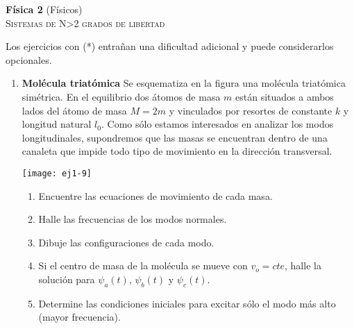 \documentclass[11pt,spanish,a4paper]{article}
\begin{document}
\begin{center}
\textbf{Física 2} (Físicos) \hfill {}\\
	\textsc{\LARGE Sistemas de N\textgreater2 grados de libertad}
\end{center}

Los ejercicios con (*) entrañan una dificultad adicional y puede considerarlos opcionales.


\begin{enumerate}


\item
\begin{minipage}[t][2.6cm]{0.75\textwidth}
\textbf{Molécula triatómica}
Se esquematiza en la figura una molécula triatómica simétrica.
En el equilibrio dos átomos de masa $m$ están situados a ambos lados del átomo de masa $M=2m$ y vinculados por resortes de constante $k$ y longitud natural $l_0$.
Como sólo estamos interesados en analizar los modos longitudinales, supondremos que las masas se encuentran dentro de una canaleta que impide todo tipo de movimiento en la dirección transversal.
\end{minipage}
\begin{minipage}[c][0cm][t]{0.2\textwidth}
  \texttt{[image: ej1-9]}
\end{minipage}
\begin{enumerate}
	\item Encuentre las ecuaciones de movimiento de cada masa. 
	\item Halle las frecuencias de los modos normales. 
	\item Dibuje las configuraciones de cada modo. 
\item Si el centro de masa de la molécula  se mueve con $v_o=cte$, halle la solución para $\psi_a(t)$, $\psi_b(t)$ y $\psi_c(t)$.
	\item Determine las condiciones iniciales para excitar sólo el modo más alto (mayor frecuencia).
\end{enumerate}




\end{enumerate}
\end{document}
